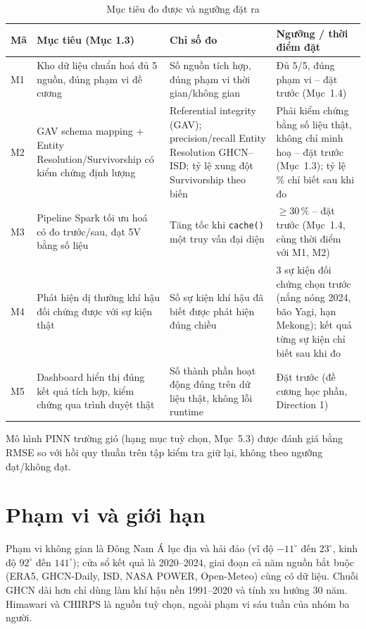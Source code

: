 \documentclass[12pt,a4paper]{report}
\begin{document}
\begin{table}[H]
\centering
\caption{Mục tiêu đo được và ngưỡng đặt ra}
\label{tab:measurable-goals}
\begin{tabular}{@{}L{0.8cm}L{4.4cm}L{4.2cm}L{3.4cm}@{}}
\toprule
\textbf{Mã} & \textbf{Mục tiêu (Mục 1.3)} & \textbf{Chỉ số đo} & \textbf{Ngưỡng / thời điểm đặt} \\
\midrule
M1 & Kho dữ liệu chuẩn hoá đủ 5 nguồn, đúng phạm vi đề cương & Số nguồn tích hợp, đúng phạm vi thời gian/không gian & Đủ 5/5, đúng phạm vi -- đặt trước (Mục~1.4) \\
M2 & GAV schema mapping + Entity Resolution/Survivorship có kiểm chứng định lượng & Referential integrity (GAV); precision/recall Entity Resolution GHCN--ISD; tỷ lệ xung đột Survivorship theo biến & Phải kiểm chứng bằng số liệu thật, không chỉ minh hoạ -- đặt trước (Mục~1.3); tỷ lệ \% chỉ biết sau khi đo \\
M3 & Pipeline Spark tối ưu hoá có đo trước/sau, đạt 5V bằng số liệu & Tăng tốc khi \texttt{cache()} một truy vấn đại diện & $\geq 30\,\%$ -- đặt trước (Mục~1.4, cùng thời điểm với M1, M2) \\
M4 & Phát hiện dị thường khí hậu đối chứng được với sự kiện thật & Số sự kiện khí hậu đã biết được phát hiện đúng chiều & 3 sự kiện đối chứng chọn trước (nắng nóng 2024, bão Yagi, hạn Mekong); kết quả từng sự kiện chỉ biết sau khi đo \\
M5 & Dashboard hiển thị đúng kết quả tích hợp, kiểm chứng qua trình duyệt thật & Số thành phần hoạt động đúng trên dữ liệu thật, không lỗi runtime & Đặt trước (đề cương học phần, Direction 1) \\
\bottomrule
\end{tabular}
\end{table}

Mô hình PINN trường gió (hạng mục tuỳ chọn, Mục~5.3) được đánh giá bằng RMSE so với hồi quy thuần
trên tập kiểm tra giữ lại, không theo ngưỡng đạt/không đạt.

\section{Phạm vi và giới hạn}

Phạm vi không gian là Đông Nam Á lục địa và hải đảo (vĩ độ $-11^\circ$ đến $23^\circ$, kinh độ
$92^\circ$ đến $141^\circ$); cửa sổ kết quả là 2020--2024, giai đoạn cả năm nguồn bắt buộc (ERA5, GHCN-Daily,
ISD, NASA POWER, Open-Meteo) cùng có dữ liệu. Chuỗi GHCN dài hơn chỉ dùng làm khí hậu nền 1991--2020 và
tính xu hướng 30 năm. Himawari và CHIRPS là nguồn tuỳ chọn, ngoài phạm vi sáu tuần của nhóm ba người.
\end{document}
